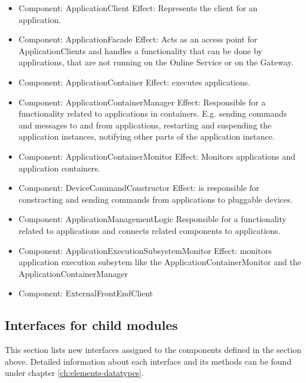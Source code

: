     \begin{itemize}
        \item Component: ApplicationClient
                Effect: Represents the client for an application.
        \item Component: ApplicationFacade
                Effect: Acts as an access point for ApplicationClients and handles a 
                        functionality that can be done by applications, 
                        that are not running on the Online Service or on the Gateway.
        \item Component: ApplicationContainer
                Effect: executes applications.
        \item Component: ApplicationContainerManager
                Effect: Responsible for a functionality related to applications in containers.
                        E.g. sending commands and messages to and from applications, restarting and
                        suspending the application instances, notifying other parts of the application instance.
        \item Component: ApplicationContainerMonitor
                Effect:  Monitors applications and application containers.
        \item Component: DeviceCommandConstructor
                Effect: is responsible for constracting and sending commands from applications to pluggable devices.   
        \item Component: ApplicationManagementLogic
                         Responsible for a functionality related to applications and connects related components to applications.
        \item Component: ApplicationExecutionSubsystemMonitor
                Effect: monitors application execution subsytem like the ApplicationContainerMonitor and the ApplicationContainerManager
        \item Component: ExternalFrontEndClient
    \end{itemize}


\subsection{Interfaces for child modules}
    This section lists new interfaces assigned to the components defined
    in the section above. Detailed information about each interface and
    its methods can be found under chapter \ref{ch:elements-datatypes}. \\

